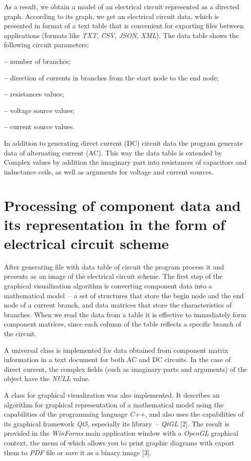\documentclass[a4paper,10pt,twoside]{article}
\begin{document}
\begin{multicols}{2}
As a result, we obtain a model of an electrical circuit represented as a directed graph. According to its graph, we get an electrical circuit data, which is presented in format of a text table that is convenient for exporting files between applications (formats like \textit{TXT}, \textit{CSV}, \textit{JSON}, \textit{XML}). The data table shows the following circuit parameters:

\textbf{--} number of branches;

\textbf{--} direction of currents in branches from the start node to the end node; 

\textbf{--} resistances values;

\textbf{--} voltage source values;

\textbf{--} current source values.

In addition to generating direct current (DC) circuit data the program generate data of alternating current (AC). This way the data table is extended by Complex values by addition the imaginary part into resistances of capacitors and inductance coils, as well as arguments for voltage and current sources.


\section{Processing of component data and its representation in the form of electrical circuit scheme}
After generating file with data table of circuit the program process it and presents as an image of the electrical circuit scheme. The first step of the graphical visualization algorithm is converting component data into a mathematical model~-- a set of structures that store the begin node and the end node of a current branch, and data matrices that store the characteristics of branches. When we read the data from a table it is effective to immediately form component matrices, since each column of the table reflects a specific branch of the circuit.

A universal class is implemented for data obtained from component matrix information in a text document for both AC and DC circuits. In the case of direct current, the complex fields (such as imaginary parts and arguments) of the object have the \textit{NULL} value.

A class for graphical visualization was also implemented. It describes an algorithm for graphical representation of a mathematical model using the capabilities of the programming language  \textit{C++}, and also uses the capabilities of its graphical framework  \textit{Qt5}, especially its library~--  \textit{QtGL} [2]. The result is provided in the  \textit{WinForms} main application window with a \textit{OpenGL} graphical context, the menu of which allows you to print graphic diagrams with export them to \textit{PDF} file or save it as a binary image [3].



\end{multicols}
\end{document}
